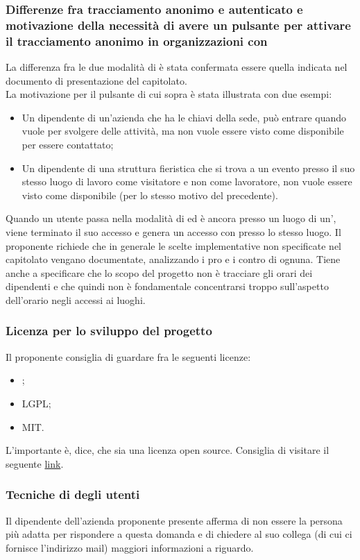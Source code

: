 \subsubsection*{Differenze fra tracciamento anonimo e autenticato e motivazione della necessità di avere un pulsante per attivare il tracciamento anonimo in organizzazioni con }
La differenza fra le due modalità di  è stata confermata essere quella indicata nel documento di presentazione del capitolato.\\
La motivazione per il pulsante di cui sopra è stata illustrata con due esempi:
\begin{itemize}
	\item Un dipendente di un'azienda che ha le chiavi della sede, può entrare quando vuole per svolgere delle attività, ma non vuole essere visto come disponibile per essere contattato;
	\item Un dipendente di una struttura fieristica che si trova a un evento presso il suo stesso luogo di lavoro come visitatore e non come lavoratore, non vuole essere visto come disponibile (per lo stesso motivo del precedente).
\end{itemize}
Quando un utente passa nella modalità di  ed è ancora presso un luogo di un', viene terminato il suo accesso e genera un accesso con  presso lo stesso luogo.
Il proponente richiede che in generale le scelte implementative non specificate nel capitolato vengano documentate, analizzando i pro e i contro di ognuna. Tiene anche a specificare che lo scopo del progetto non è
tracciare gli orari dei dipendenti e che quindi non è fondamentale concentrarsi troppo sull'aspetto dell'orario negli accessi ai luoghi.

\subsubsection*{Licenza per lo sviluppo del progetto}
Il proponente consiglia di guardare fra le seguenti licenze:
\begin{itemize}
	\item {};
	\item LGPL;
	\item MIT.
\end{itemize}
L'importante è, dice, che sia una licenza open source. Consiglia di visitare il seguente \href{https://opensource.org/licenses}{link}.

\subsubsection*{Tecniche di  degli utenti}
Il dipendente dell'azienda proponente presente afferma di non essere la persona più adatta per rispondere a questa domanda e di chiedere al suo collega (di cui ci fornisce l'indirizzo mail) maggiori informazioni a riguardo.

